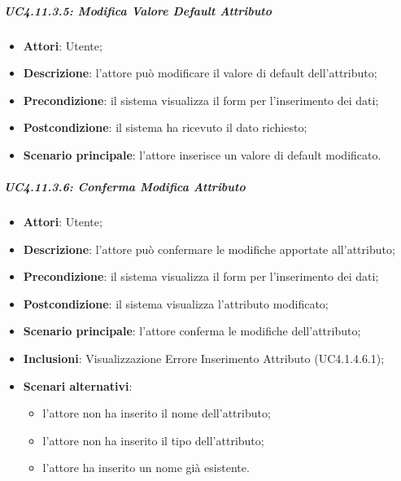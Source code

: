 \begin{itemize}
\begin{itemize}
\begin{itemize}
\begin{itemize}
\subparagraph{UC4.11.3.5: Modifica Valore Default Attributo}
\label{UC4.11.3.5}
\begin{itemize}
	\item \textbf{Attori}: Utente;
	\item \textbf{Descrizione}: l'attore può modificare il valore di default dell'attributo;
	\item \textbf{Precondizione}: il sistema visualizza il form per l'inserimento dei dati;
	\item \textbf{Postcondizione}: il sistema ha ricevuto il dato richiesto;
	\item \textbf{Scenario principale}: l'attore inserisce un valore di default modificato.
\end{itemize}

\subparagraph{UC4.11.3.6: Conferma Modifica Attributo}
\label{UC4.11.3.6}
\begin{itemize}
	\item \textbf{Attori}: Utente;
	\item \textbf{Descrizione}: l'attore può confermare le modifiche apportate all'attributo;
	\item \textbf{Precondizione}: il sistema visualizza il form per l'inserimento dei dati;
	\item \textbf{Postcondizione}: il sistema visualizza l'attributo modificato;
	\item \textbf{Scenario principale}: l'attore conferma le modifiche dell'attributo;
	\item \textbf{Inclusioni}:
	Visualizzazione Errore Inserimento Attributo (UC4.1.4.6.1);
	\item \textbf{Scenari alternativi}:
	\begin{itemize}
	\item l'attore non ha inserito il nome dell'attributo;
	\item l'attore non ha inserito il tipo dell'attributo;
	\item l'attore ha inserito un nome già esistente.
	\end{itemize}
\end{itemize}


\end{itemize}
\end{itemize}
\end{itemize}
\end{itemize}
